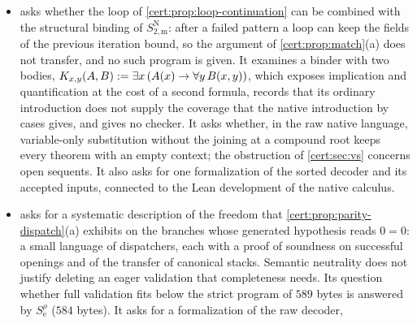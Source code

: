 \begin{itemize}
 and  are implementation
evidence: $260$ isolated executions of $65$ cases on $S^{\mathrm T}_{3\mathrm f,\ell}$ and
its control, ordinary and optimized, and a comparison of $9461$ states of the recursive
and the looping program on $21$ cases, in the first; $514$ isolated executions, $180$
on the compact programs and $334$ on the strict ones, in the second; $806$ isolated
executions, four of them of the unsound variants of \cref{cert:rem:floor-order} and of
the end of \cref{cert:sec:validated}, in the third; $420$ executions of the four
compositions, $102$ of $S^{\mathrm x}$ and $13$ checks of its grammar in the fourth. The
proofs of \cref{cert:prop:loop-continuation,cert:prop:eager-three,cert:prop:parity-dispatch,cert:thm:floor-phase,cert:prop:exact-image,cert:prop:second-dummy}
are written proofs for ideal executions, and no package claims a formalization in a
proof assistant.
\item {} asks whether the loop of
\cref{cert:prop:loop-continuation} can be combined with the structural binding of
$S^{\mathrm N}_{2,\mathrm m}$: after a failed pattern a loop can keep the fields of the
previous iteration bound, so the argument of \cref{cert:prop:match}(a) does not
transfer, and no such program is given. It examines a binder with two bodies,
$K_{x,y}(A,B)\mathrel{:=}\exists x\,(A(x)\to\forall y\,B(x,y))$, which exposes implication and
quantification at the cost of a second formula, records that its ordinary introduction
does not supply the coverage that the native introduction by cases gives, and gives no
checker. It asks whether, in the raw native language, variable-only substitution without
the joining at a compound root keeps every theorem with an empty context; the
obstruction of \cref{cert:sec:vs} concerns open sequents. It also asks for one
formalization of the sorted decoder and its accepted inputs, connected to the Lean
development of the native calculus.
\item {} asks for a systematic description of the freedom that
\cref{cert:prop:parity-dispatch}(a) exhibits on the branches whose generated hypothesis
reads $0=0$: a small language of dispatchers, each with a proof of soundness on
successful openings and of the transfer of canonical stacks. Semantic neutrality does
not justify deleting an eager validation that completeness needs. Its question whether
full validation fits below the strict program of $589$ bytes is answered by
$S^{\rho}_{\mathrm e}$ ($584$ bytes). It asks for a formalization of the raw decoder,

\end{itemize}
